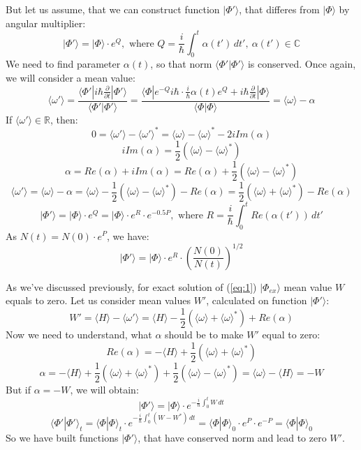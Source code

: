 \documentclass[a4paper,14pt]{extarticle}
\begin{document}
But let us assume, that we can construct function $|\Phi'\rangle$, that differes from $|\Phi\rangle$ by angular multiplier:
$$|\Phi'\rangle = |\Phi\rangle\cdot e^Q,\text{ where } Q = \frac{i}{\hbar}\int_0^t\alpha(t')\,dt',\ \alpha(t')\in\mathbb{C}$$
We need to find parameter $\alpha(t)$, so that norm $\langle\Phi'|\Phi'\rangle$ is conserved. Once again, we will consider a mean value:
$$\langle\omega'\rangle = \frac{\langle\Phi'|i\hbar\frac{\partial}{\partial t}|\Phi'\rangle}{\langle\Phi'|\Phi'\rangle} = %
			  \frac{\langle\Phi|e^{-Q} i\hbar \cdot \frac{i}{\hbar} \alpha(t) e^Q + %
			   i\hbar\frac{\partial}{\partial t}|\Phi\rangle}{\langle\Phi|\Phi\rangle}=\langle\omega\rangle - \alpha$$
If $\langle\omega'\rangle\in\mathbb{R}$, then:
$$0 = \langle\omega'\rangle-\langle\omega'\rangle^* = \langle\omega\rangle - \langle\omega\rangle^* - 2i\mathit{Im}( \alpha )$$
$$i\mathit{Im}( \alpha ) = \frac{1}{2}\left( \langle\omega\rangle - \langle\omega\rangle^*\right)$$
$$\alpha = \mathit{Re}( \alpha ) + i\mathit{Im}( \alpha ) = %
	   \mathit{Re}( \alpha ) + \frac{1}{2}\left( \langle\omega\rangle - \langle\omega\rangle^*\right)$$
$$\langle\omega'\rangle = \langle\omega\rangle - \alpha = %
			  \langle\omega\rangle - \frac{1}{2}\left(\langle\omega\rangle - %
								  \langle\omega\rangle^*\right) - \mathit{Re}( \alpha ) = %
			  \frac{1}{2}\left(\langle\omega\rangle + \langle\omega\rangle^*\right) - \mathit{Re}( \alpha )$$
$$|\Phi'\rangle = |\Phi\rangle\cdot e^Q = |\Phi\rangle\cdot e^R\cdot e^{-0.5P},%
					      \text{ where } R = \frac{i}{\hbar}\int_0^t\mathit{Re}(\alpha(t'))\,dt'$$
As $N(t) = N(0)\cdot e^P $, we have:
$$|\Phi'\rangle = |\Phi\rangle\cdot e^R\cdot\left(\frac{N(0)}{N(t)}\right)^{1/2}$$

As we've discussed previously, for exact solution of (\ref{eq:1}) $|\Phi_{ex}\rangle$ mean value $W$ equals to zero.
 Let us consider mean values $W'$, calculated on function $|\Phi'\rangle$:
$$W' = \langle H\rangle - \langle\omega'\rangle = %
		      \langle H\rangle - \frac{1}{2}\left(\langle\omega\rangle+\langle\omega\rangle^*\right)+\mathit{Re}(\alpha)$$
Now we need to understand, what $\alpha$ should be to make $W'$ equal to zero:
$$\mathit{Re}(\alpha) = -\langle H\rangle + \frac{1}{2}\left(\langle\omega\rangle+\langle\omega\rangle^*\right)$$
$$\alpha = -\langle H\rangle + \frac{1}{2}\left(\langle\omega\rangle+\langle\omega\rangle^*\right) +%
			      \frac{1}{2}\left(\langle\omega\rangle-\langle\omega\rangle^*\right)=%
	    \langle\omega\rangle - \langle H\rangle = -W$$
But if $\alpha = -W$, we will obtain:
$$|\Phi'\rangle = |\Phi\rangle\cdot e^{ -\frac{i}{\hbar}\int_0^t W\,dt}$$
$$\langle\Phi'|\Phi'\rangle_t = \langle\Phi|\Phi\rangle_t\cdot e^{ -\frac{i}{\hbar}\int_0^t(W-W^*)\,dt} = %
				\langle\Phi|\Phi\rangle_0\cdot e^P\cdot e^{-P} = \langle\Phi|\Phi\rangle_0$$
So we have built functions $|\Phi'\rangle$, that have conserved norm and lead to zero $W'$. 
\end{document}
